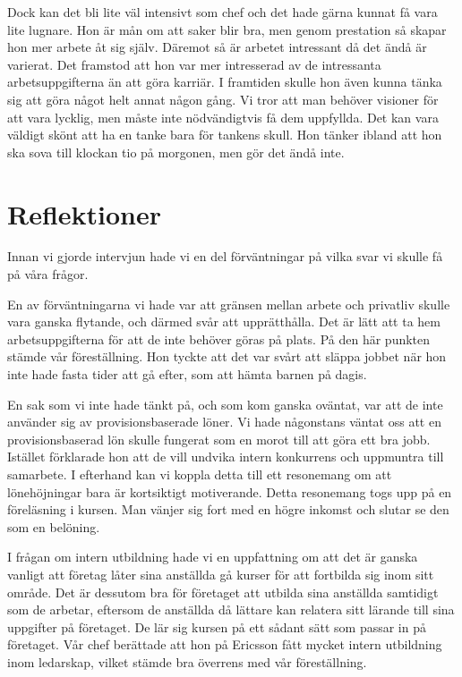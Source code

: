 \documentclass[a4paper,10pt,twoside]{article}
\begin{document}
Dock kan det bli lite väl intensivt som chef och det hade gärna kunnat få vara lite lugnare. Hon är mån om att saker blir bra, men genom prestation så skapar hon mer arbete åt sig själv. Däremot så är arbetet intressant då det ändå är varierat. Det framstod att hon var mer intresserad av de intressanta arbetsuppgifterna än att göra karriär. I framtiden skulle hon även kunna tänka sig att göra något helt annat någon gång. Vi tror att man behöver visioner för att vara lycklig, men måste inte nödvändigtvis få dem uppfyllda. Det kan vara väldigt skönt att ha en tanke bara för tankens skull. Hon tänker ibland att hon ska sova till klockan tio på morgonen, men gör det ändå inte.


\section{Reflektioner} %
\label{sec:reflektion}

Innan vi gjorde intervjun hade vi en del förväntningar på vilka svar vi skulle få på våra frågor.

En av förväntningarna vi hade var att gränsen mellan arbete och privatliv skulle vara ganska flytande, och därmed svår att upprätthålla. Det är lätt att ta hem arbetsuppgifterna för att de inte behöver göras på plats. På den här punkten stämde vår föreställning. Hon tyckte att det var svårt att släppa jobbet när hon inte hade fasta tider att gå efter, som att hämta barnen på dagis.


En sak som vi inte hade tänkt på, och som kom ganska oväntat, var att de inte använder sig av provisionsbaserade löner. Vi hade någonstans väntat oss att en provisionsbaserad lön skulle fungerat som en morot till att göra ett bra jobb. Istället förklarade hon att de vill undvika intern konkurrens och uppmuntra till samarbete. I efterhand kan vi koppla detta till ett resonemang om att lönehöjningar bara är kortsiktigt motiverande. Detta resonemang togs upp på en föreläsning i kursen. Man vänjer sig fort med en högre inkomst och slutar se den som en belöning.

I frågan om intern utbildning hade vi en uppfattning om att det är ganska vanligt att företag låter sina anställda gå kurser för att fortbilda sig inom sitt område. Det är dessutom bra för företaget att utbilda sina anställda samtidigt som de arbetar, eftersom de anställda då lättare kan relatera sitt lärande till sina uppgifter på företaget. De lär sig kursen på ett sådant sätt som passar in på företaget. Vår chef berättade att hon på Ericsson fått mycket intern utbildning inom ledarskap, vilket stämde bra överrens med vår föreställning.
\end{document}
